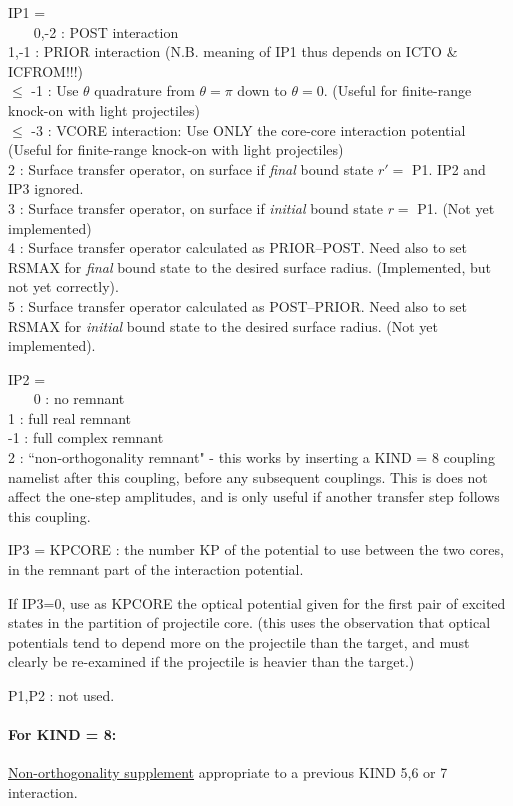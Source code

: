 \documentclass[11pt]{article}
\begin{document}
\begin{description}
IP1 =\\
~~~  0,-2 : POST interaction
\\  1,-1 : PRIOR interaction
 (N.B. meaning of IP1 thus depends on ICTO \& ICFROM!!!)
\\  $\le$ -1 : Use $\theta$ quadrature from $\theta = \pi$ down to $\theta = 0$.
 (Useful for finite-range knock-on with light projectiles)
\\  $\le$ -3 : VCORE interaction:
Use ONLY the core-core interaction potential
 (Useful for finite-range knock-on with light projectiles)
\\ 2 : Surface transfer operator, on surface if {\em final} bound state $r' =$ P1. IP2 and IP3 ignored.
\\ 3 : Surface transfer operator, on surface if {\em initial} bound state $r =$ P1. (Not yet implemented)
\\ 4 : Surface transfer operator calculated as PRIOR--POST. Need also to set RSMAX for {\em final} bound state to the desired surface radius. 
   (Implemented, but not yet correctly).
\\ 5 : Surface transfer operator calculated as POST--PRIOR. Need also to set RSMAX for {\em initial} bound state to the desired surface radius. 
   (Not yet implemented).


IP2 =\\
~~~  0 : no remnant
\\  1 : full real remnant
\\  -1 : full complex remnant
\\  2 : ``non-orthogonality remnant" - this works by inserting
a KIND = 8 coupling namelist after this coupling, before any subsequent
couplings.
This is does not affect the one-step amplitudes, and is only useful
if another transfer step follows this coupling.



 IP3 = KPCORE : the number KP of the potential to use between
the two cores, in the remnant part of the interaction potential.

       If IP3=0, use as KPCORE the optical potential given for
the first pair of excited states in the partition of projectile core.
(this uses the observation that optical potentials tend to depend
more on the projectile than the target, and must clearly be re-examined
if the projectile is heavier than the target.)

 P1,P2 : not used.


\paragraph{For KIND = 8:}
\underline{Non-orthogonality supplement}
appropriate to a previous
KIND 5,6 or 7 interaction.



\end{description}
\end{document}
